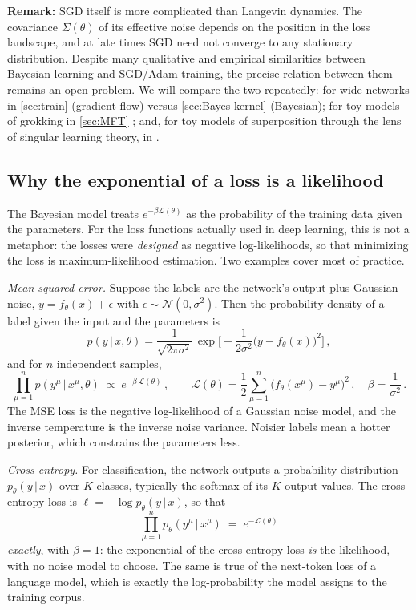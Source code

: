 \documentclass[11pt]{article}
\newcommand{\CN}{{\mathcal N}}
\newcommand{\CL}{{\mathcal L}}
\begin{document}
\smallskip
\textbf{Remark:} SGD itself is more complicated than Langevin dynamics. The covariance $\Sigma(\theta)$ of its effective noise depends on the position in the loss landscape, and at late times SGD need not converge to any stationary distribution. Despite many qualitative and empirical similarities between Bayesian learning and SGD/Adam training, the precise relation between them remains an open problem. We will compare the two repeatedly: for wide networks in \cref{sec:train} (gradient flow) versus \cref{sec:Bayes-kernel} (Bayesian); for toy models of grokking in \cref{sec:MFT} \cite{rubin2024grokking}; and, for toy models of superposition \cite{elhage2022superposition} through the lens of singular learning theory, in \cite{chen2023dynamical}.

\subsection{Why the exponential of a loss is a likelihood}
\label{sec:loss-likelihood}

The Bayesian model treats $e^{-\beta\CL(\theta)}$ as the probability of the training data given the parameters. For the loss functions actually used in deep learning, this is not a metaphor: the losses were \emph{designed} as negative log-likelihoods, so that minimizing the loss is maximum-likelihood estimation. Two examples cover most of practice.

\emph{Mean squared error.} Suppose the labels are the network's output plus Gaussian noise, $y = f_\theta(x) + \epsilon$ with $\epsilon\sim\CN(0,\sigma^2)$. Then the probability density of a label given the input and the parameters is
%
\begin{equation}
    p(y\,|\,x,\theta) = \frac{1}{\sqrt{2\pi\sigma^2}}\,\exp\Big[-\frac{1}{2\sigma^2}\big(y-f_\theta(x)\big)^2\Big]\,,
\end{equation}
%
and for $n$ independent samples,
%
\begin{equation}
    \prod_{\mu=1}^n p(y^\mu\,|\,x^\mu,\theta) \;\propto\; e^{-\beta\,\CL(\theta)}\,,\qquad \CL(\theta) = \frac{1}{2}\sum_{\mu=1}^n\big(f_\theta(x^\mu)-y^\mu\big)^2\,,\quad \beta = \frac{1}{\sigma^2}\,. \label{mse-likelihood}
\end{equation}
%
The MSE loss is the negative log-likelihood of a Gaussian noise model, and the inverse temperature is the inverse noise variance. Noisier labels mean a hotter posterior, which constrains the parameters less.

\emph{Cross-entropy.} For classification, the network outputs a probability distribution $p_\theta(y\,|\,x)$ over $K$ classes, typically the softmax of its $K$ output values. The cross-entropy loss is $\ell = -\log p_\theta(y\,|\,x)$, so that
%
\begin{equation}
    \prod_{\mu=1}^n p_\theta(y^\mu\,|\,x^\mu) \;=\; e^{-\CL(\theta)} \label{ce-likelihood}
\end{equation}
%
\emph{exactly}, with $\beta = 1$: the exponential of the cross-entropy loss \emph{is} the likelihood, with no noise model to choose. The same is true of the next-token loss of a language model, which is exactly the log-probability the model assigns to the training corpus.
\end{document}
